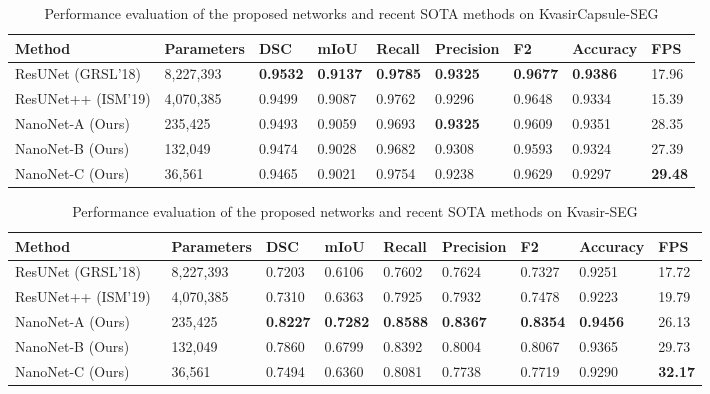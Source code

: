 \documentclass[journal]{IEEEtran}
\begin{document}
\begin{table*}[!t]
\centering
\caption{Performance evaluation of the proposed networks and recent \ac{SOTA} methods on KvasirCapsule-SEG}
\footnotesize
\begin{tabular}{l|l|l|l|l|l|l|l|l}
\toprule
\textbf{Method} &\textbf{Parameters} & \textbf{DSC} & \textbf{mIoU} & \textbf{Recall} & \textbf{Precision}& \textbf{F2} & \textbf{Accuracy} &\textbf{FPS} \\ \hline
ResUNet (GRSL'18)~\cite{zhang2018road}&8,227,393 &\textbf{0.9532} &\textbf{0.9137} &\textbf{0.9785} &\textbf{0.9325} &\textbf{0.9677} &\textbf{0.9386} &17.96 \\ 

ResUNet++ (ISM'19)\cite{jha2019resunet++} & 4,070,385 & 0.9499 & 0.9087 & 0.9762 & 0.9296 & 0.9648 & 0.9334 & 15.39\\

NanoNet-A (Ours) &235,425 &0.9493 &0.9059 &0.9693 & \textbf{0.9325} &0.9609 &0.9351 &28.35  \\ NanoNet-B (Ours)&132,049 &0.9474 &0.9028 &0.9682 &0.9308 &0.9593 &0.9324 &27.39 \\ NanoNet-C (Ours)&36,561  &0.9465 &0.9021 &0.9754 &0.9238 &0.9629 &0.9297 &\textbf{29.48}\\
\bottomrule
\end{tabular}
\label{tab:resultKvasirCapsule-SEG}
\end{table*}
\begin{table*}[!t]
\centering  
\caption{Performance evaluation of the proposed networks and recent \ac{SOTA} methods on Kvasir-SEG\cite{jha2020kvasir}}
\footnotesize
\begin{tabular}{l|l|l|l|l|l|l|l|l}
\toprule
\textbf{Method} &\textbf{Parameters} & \textbf{DSC}  & \textbf{mIoU} & \textbf{Recall} & \textbf{Precision} & \textbf{F2} & \textbf{Accuracy} & \textbf{FPS} \\ \hline
ResUNet (GRSL'18)~\cite{zhang2018road} & 8,227,393 & 0.7203 & 0.6106 & 0.7602 & 0.7624 & 0.7327 & 0.9251 & 17.72 \\ 

ResUNet++ (ISM'19)~\cite{jha2019resunet++} & 4,070,385 & 0.7310 & 0.6363 & 0.7925 & 0.7932 & 0.7478 & 0.9223 & 19.79 \\

NanoNet-A (Ours)& 235,425  & \textbf{0.8227} & \textbf{0.7282} & \textbf{0.8588} & \textbf{0.8367} & \textbf{0.8354}& \textbf{0.9456} & 26.13  \\ NanoNet-B (Ours)& 132,049  & 0.7860 & 0.6799 & 0.8392 & 0.8004 & 0.8067 & 0.9365 & 29.73\\ NanoNet-C (Ours)& 36,561   & 0.7494 & 0.6360 & 0.8081 & 0.7738 & 0.7719 & 0.9290 & \textbf{32.17}\\ 
\bottomrule
\end{tabular}
\label{tab:resultKvasir-SEG}

\end{table*}
\end{document}
